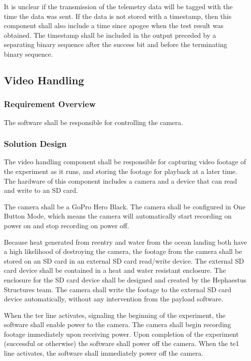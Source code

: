 \documentclass[letterpaper,10pt]{article}
\begin{document}
It is unclear if the transmission of the telemetry data will be tagged with the time
the data was sent.
If the data is not stored with a timestamp, then this component shall also include
a time since \gls{apogee} when the test result was obtained.
The timestamp shall be included in the output preceded by a separating binary
sequence after the success bit and before the terminating binary sequence. 

\subsection{Video Handling}
\subsubsection{Requirement Overview}
The software shall be responsible for controlling the camera.

\subsubsection{Solution Design}
The video handling component shall be responsible for capturing video footage of
the experiment as it runs, and storing the footage for playback at a later time.
The hardware of this component includes a camera and a device that can read
and write to an SD card.

The camera shall be a GoPro Hero Black.
The camera shall be configured in One Button Mode, which means the  camera will
automatically start recording on power on and stop recording on power off. 

Because heat generated from reentry and water from the ocean landing both have
a high likelihood of destroying the camera, the footage from the camera shall be
stored on an SD card in an external SD card read/write device. 
The external SD card device shall be contained in a heat and water resistant enclosure.
The enclosure for the SD card device shall be designed and created by the Hephaestus Structures team.
The camera shall write the footage to the external SD card device automatically,
without any intervention from the payload software. 

When the \gls{ter} line activates, signaling the beginning of the experiment,
the software shall enable power to the camera.
The camera shall begin recording footage immediately upon receiving power. 
Upon completion of the experiment (successful or otherwise) the software shall
power off the camera.
When the \gls{te1} line activates, the software shall immediately power off the
camera.
\end{document}
